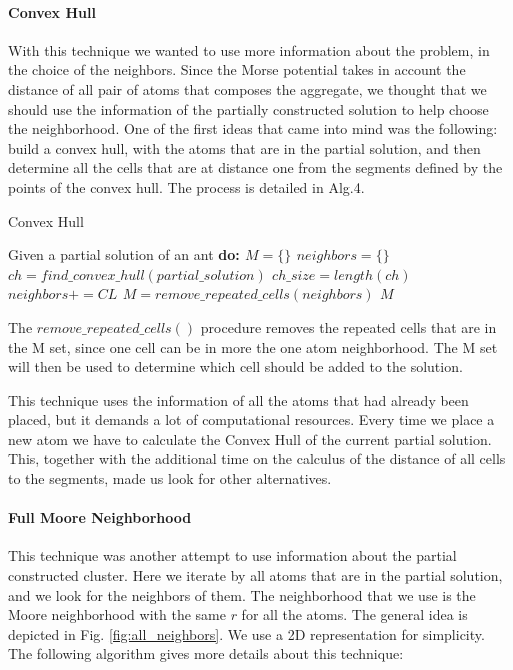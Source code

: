 			\paragraph*{Convex Hull}
			With this technique we wanted to use more information about the problem, in the choice of the neighbors. Since the Morse potential takes in account the distance of all pair of atoms that composes the aggregate, we thought that we should use the information of the partially constructed solution to help choose the neighborhood. One of the first ideas that came into mind was the following: build a convex hull, with the atoms that are in the partial solution, and then determine all the cells that are at distance one from the segments defined by the points of the convex hull. The process is detailed in Alg.4.
			\begin{algorithm}
				\caption{Convex Hull}
				\label{alg:convex_hull}
				\begin{algorithmic}
				\STATE Given a partial solution of an ant \bf{do}:
				\STATE $M = \{\}$
				\STATE $neighbors = \{\}$
				\STATE $ch = find\_convex\_hull(partial\_solution)$
				\STATE $ch\_size = length(ch)$
							\STATE $neighbors += CL$
						\ENDIF
					\ENDFOR
				\ENDFOR
				\STATE $M = remove\_repeated\_cells(neighbors)$
				\RETURN $M$
				\end{algorithmic}
			\end{algorithm}
			
			The $remove\_repeated\_cells()$ procedure removes the repeated cells that are in the M set, since one cell can be in more the one atom neighborhood.
			The M set will then be used to determine which cell should be added to the solution.

			This technique uses the information of all the atoms that had already been placed, but it demands a lot of computational resources. Every time we place a new atom we have to calculate the Convex Hull of the current partial solution. This, together with the additional time on the calculus of the distance of all cells to the segments, made us look for other alternatives.
			
			\paragraph*{Full Moore Neighborhood}
			This technique was another attempt to use information about the partial constructed cluster. Here we iterate by all atoms that are in the partial solution, and we look for the neighbors of them. The neighborhood that we use is the Moore neighborhood with the same $r$ for all the atoms. The general idea is depicted in Fig. \ref{fig:all_neighbors}. We use a 2D representation for simplicity. The following algorithm gives more details about this technique:
		
